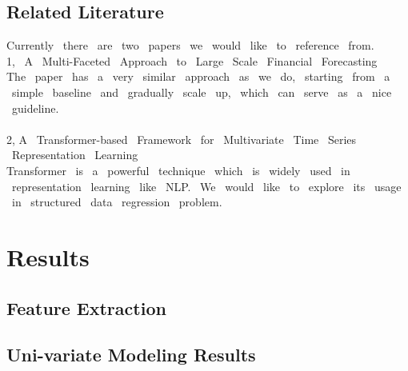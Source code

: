\documentclass{article}
\begin{document}
\subsection{Related Literature}

Currently \ there \ are \ two \ papers \ we \ would \ like \ to \ reference \ from.\\
1, \ A \ Multi-Faceted \ Approach \ to \ Large \ Scale \ Financial \ Forecasting \\ The \ paper \ has \ a \ very \ similar \ approach \ as \ we \ do, \ starting \ from \ a \ simple \ baseline \ and \ gradually \ scale \ up, \ which \ can \ serve \ as \ a \ nice \ guideline. \\ \\2, A \ Transformer-based \ Framework \ for \ Multivariate \ Time \ Series \ Representation \ Learning \\Transformer \ is \ a \ powerful \ technique \ which \ is \ widely \ used \ in \ representation \ learning \ like \ NLP. \ We \ would \ like \ to \ explore \ its \ usage \ in \ structured \ data \ regression \ problem.  
\section{Results}
\subsection{Feature Extraction}
\subsection{Uni-variate Modeling Results}
\end{document}
